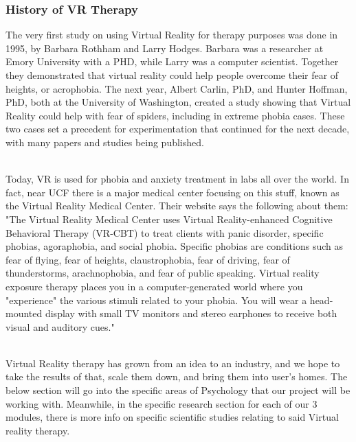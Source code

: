\documentclass[a4paper,10pt]{article}
\begin{document}
\subsubsection{History of VR Therapy}
The very first study on using Virtual Reality for therapy purposes was done in 1995, by Barbara Rothham and Larry Hodges.  Barbara was a researcher at Emory University with a PHD, while Larry was a computer scientist.  Together they demonstrated that virtual reality could help people overcome their fear of heights, or acrophobia.  \cite{alCarl}
The next year, Albert Carlin, PhD, and Hunter Hoffman, PhD, both at the University of Washington, created a study showing that Virtual Reality could help with fear of spiders, including in extreme phobia cases.  These two cases set a precedent for experimentation that continued for the next decade, with many papers and studies being published.
\par~\\
Today, VR is used for phobia and anxiety treatment in labs all over the world.  In fact, near UCF there is a major medical center focusing on this stuff, known as the Virtual Reality Medical Center.  Their website says the following about them: "The Virtual Reality Medical Center uses Virtual Reality-enhanced Cognitive Behavioral Therapy (VR-CBT) to treat clients with panic disorder, specific phobias, agoraphobia, and social phobia. Specific phobias are conditions such as fear of flying, fear of heights, claustrophobia, fear of driving, fear of thunderstorms, arachnophobia, and fear of public speaking. Virtual reality exposure therapy places you in a computer-generated world where you "experience" the various stimuli related to your phobia. You will wear a head- mounted display with small TV monitors and stereo earphones to receive both visual and auditory cues."\cite{vrPhobia}
\par~\\
Virtual Reality therapy has grown from an idea to an industry, and we hope to take the results of that, scale them down, and bring them into user's homes.  The below section will go into the specific areas of Psychology that our project will be working with.  Meanwhile, in the specific research section for each of our 3 modules, there is more info on specific scientific studies relating to said Virtual reality therapy.
\par~\\
\pagebreak
\end{document}
